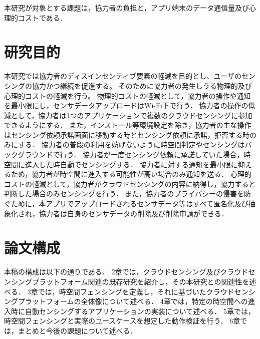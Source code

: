 本研究が対象とする課題は，協力者の負担と，アプリ端末のデータ通信量及び心理的コストである．


\section{研究目的}
\label{sec:thesis}

本研究では協力者のディスインセンティブ要素の軽減を目的とし、ユーザのセンシングの協力かつ継続を促進する。
そのために協力者の発生しうる物理的及び心理的コストの軽減を行う。
物理的コストの軽減として，協力者の操作や通知を最小限にし，センサデータアップロードはWi-Fi下で行う．
協力者の操作の低減として，協力者は1つのアプリケーションで複数のクラウドセンシングに参加できるようにする．
また，インストール等環境設定を除き，協力者の主な操作はセンシング依頼承諾画面に移動する時とセンシング依頼に承諾，拒否する時のみにする．
協力者の普段の利用を妨げないように時空間判定やセンシングはバックグラウンドで行う．
協力者が一度センシング依頼に承諾していた場合，時空間に進入した時自動でセンシングする．
協力者に対する通知を最小限に抑えるため，協力者が時空間に進入する可能性が高い場合のみ通知を送る．
心理的コストの軽減として，協力者がクラウドセンシングの内容に納得し，協力すると判断した場合のみセンシングを行う．
また，協力者のプライバシーの侵害を防ぐために，本アプリでアップロードされるセンサデータ等はすべて匿名化及び抽象化され，協力者は自身のセンサデータの削除及び削除申請ができる．


\section{論文構成}
\label{sec:presentation}

本稿の構成は以下の通りである．
2章では，クラウドセンシング及びクラウドセンシングプラットフォーム関連の既存研究を紹介し，その本研究との関連性を述べる．
3章では，時空間フェンシングを定義し，それに基づいたクラウドセンシングプラットフォームの全体像について述べる．
4章では，特定の時空間への進入時に自動センシングするアプリケーションの実装について述べる．
5章では，時空間フェンシングと実際のユースケースを想定した動作検証を行う．
6章では，まとめと今後の課題について述べる．


